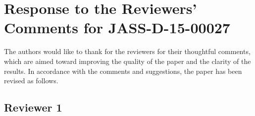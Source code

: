 \documentclass[11pt]{article}
\begin{document}

\section*{Response to the Reviewers' Comments for JASS-D-15-00027}

The authors would like to thank for the reviewers for their thoughtful comments, which are aimed toward improving the quality of the paper and the clarity of the results. In accordance with the comments and suggestions, the paper has been revised as follows. 

\subsection*{Reviewer 1}

\setlength{\leftmargini}{0pt}
\end{document}
